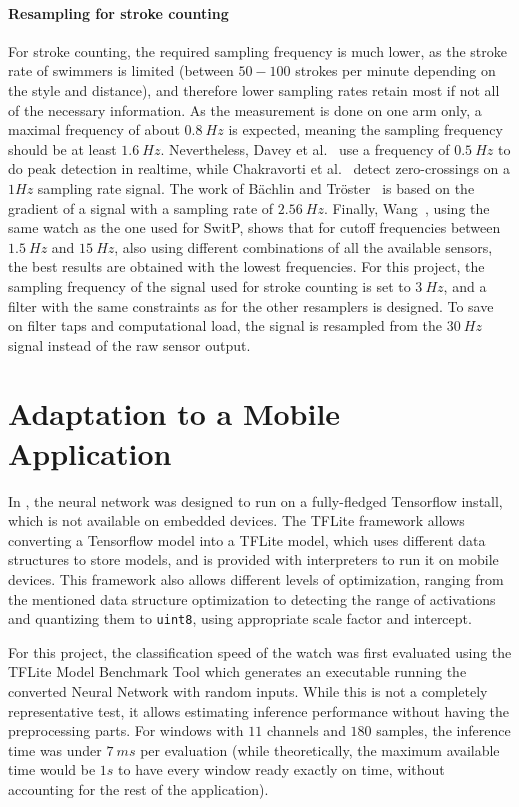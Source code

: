 \documentclass[a4paper, oneside]{discothesis}
\begin{document}
\paragraph{Resampling for stroke counting} For stroke counting, the required sampling frequency is much lower, as the stroke rate of swimmers is limited (between $50-100$ strokes per minute depending on the style and distance), and therefore lower sampling rates retain most if not all of the necessary information. As the measurement is done on one arm only, a maximal frequency of about $0.8~Hz$ is expected, meaning the sampling frequency should be at least $1.6~Hz$. Nevertheless, Davey et al.~\cite{DAJ08} use a frequency of $0.5~Hz$ to do peak detection in realtime, while Chakravorti et al.~\cite{CSSC13} detect zero-crossings on a $1Hz$ sampling rate signal. The work of Bächlin and Tröster~\cite{BG11} is based on the gradient of a signal with a sampling rate of $2.56~Hz$. Finally, Wang~\cite{WANG19}, using the same watch as the one used for SwitP, shows that for cutoff frequencies between $1.5~Hz$ and $15~Hz$, also using different combinations of all the available sensors, the best results are obtained with the lowest frequencies. For this project, the sampling frequency of the signal used for stroke counting is set to $3~Hz$, and a filter with the same constraints as for the other resamplers is designed. To save on filter taps and computational load, the signal is resampled from the $30~Hz$ signal instead of the raw sensor output.

\section{Adaptation to a Mobile Application}
In \cite{BMSW19}, the neural network was designed to run on a fully-fledged Tensorflow install, which is not available on embedded devices. The TFLite framework \cite{TFLite20} allows converting a Tensorflow model into a TFLite model, which uses different data structures to store models, and is provided with interpreters to run it on mobile devices. This framework also allows different levels of optimization, ranging from the mentioned data structure optimization to detecting the range of activations and quantizing them to \texttt{uint8}, using appropriate scale factor and intercept. 

For this project, the classification speed of the watch was first evaluated using the TFLite Model Benchmark Tool \cite{TFLiteBench20} which generates an executable running the converted Neural Network with random inputs. While this is not a completely representative test, it allows estimating inference performance without having the preprocessing parts. For windows with $11$ channels and $180$ samples, the inference time was under $7~ms$ per evaluation (while theoretically, the maximum available time would be $1s$ to have every window ready exactly on time, without accounting for the rest of the application).
\end{document}
